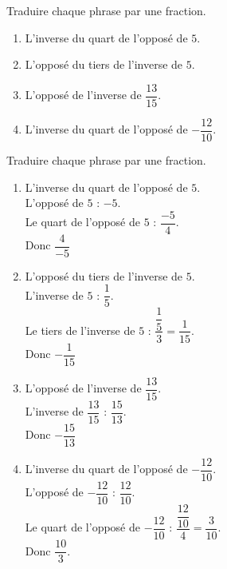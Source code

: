 \begin{exercice*}
    Traduire chaque phrase par une fraction.
    \begin{enumerate}
        \item L'inverse du quart de l'opposé de $5$.
        \item L'opposé du tiers de l'inverse de $5$.
        \item L'opposé de l'inverse de $\dfrac{13}{15}$.
        \item L'inverse du quart de l'opposé de $-\dfrac{12}{10}$.
    \end{enumerate}
\end{exercice*}
\begin{corrige}
    Traduire chaque phrase par une fraction.

    \begin{enumerate}
        \item L'inverse du quart de l'opposé de $5$.\\
        {\red L'opposé de $5$ : $-5$.\\Le quart de l'opposé de $5$ : $\dfrac{-5}{4}$.\\Donc $\dfrac{4}{-5}$}
        \item L'opposé du tiers de l'inverse de $5$.\\
        {\red L'inverse de $5$ : $\dfrac{1}{5}$.\\Le tiers de l'inverse de $5$ : $\dfrac{\dfrac{1}{5}}{3}=\dfrac{1}{15}$.\\Donc $-\dfrac{1}{15}$}
        \item L'opposé de l'inverse de $\dfrac{13}{15}$.\\
        {\red L'inverse de $\dfrac{13}{15}$ : $\dfrac{15}{13}$.\\Donc $-\dfrac{15}{13}$}
        \item L'inverse du quart de l'opposé de $-\dfrac{12}{10}$.\\
        {\red L'opposé de $-\dfrac{12}{10}$ : $\dfrac{12}{10}$.\\Le quart de l'opposé de $-\dfrac{12}{10}$ : $\dfrac{\dfrac{12}{10}}{4}=\dfrac{3}{10}$.\\Donc $\dfrac{10}{3}$.}
    \end{enumerate}
    \vspace*{-7mm}
\end{corrige}

